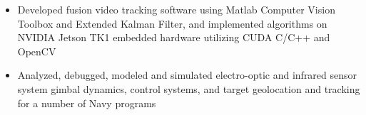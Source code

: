 \begin{itemize} [leftmargin = \itemmargin]
	\item Developed fusion video tracking software using Matlab Computer Vision Toolbox and Extended Kalman Filter, and implemented algorithms on NVIDIA Jetson TK1 embedded hardware utilizing CUDA C/C++ and OpenCV
	\item Analyzed, debugged, modeled and simulated electro-optic and infrared sensor system gimbal dynamics, control systems, and target geolocation and tracking for a number of Navy programs
	
\end{itemize} 